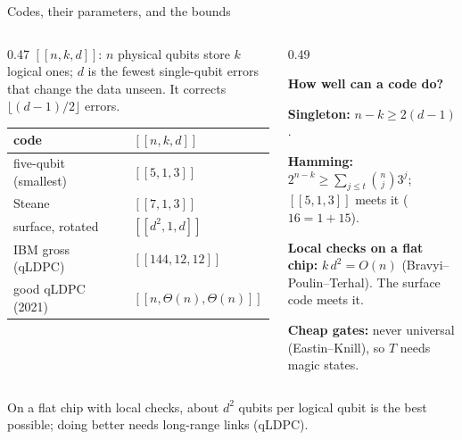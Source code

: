 \documentclass[aspectratio=169,11pt]{beamer}
\newcommand{\blocktitle}[1]{{\bfseries #1}\par\vskip1mm}
\begin{document}
{
\begin{frame}[noframenumbering]{Codes, their parameters, and the bounds}
  \begin{columns}[T,onlytextwidth]
    \begin{column}{0.47\textwidth}
      \small
      $[[n,k,d]]$: $n$ physical qubits store $k$ logical ones; $d$ is the fewest single-qubit errors that change the data unseen. It corrects $\lfloor(d-1)/2\rfloor$ errors.\par\vskip1mm
      \centering\footnotesize
      \renewcommand{\arraystretch}{1.12}
      \begin{tabular}{@{}ll@{}}
        \toprule
        code & $[[n,k,d]]$ \\
        \midrule
        five-qubit (smallest) & $[[5,1,3]]$ \\
        Steane & $[[7,1,3]]$ \\
        surface, rotated & $[[d^2,1,d]]$ \\
        IBM gross (qLDPC) & $[[144,12,12]]$ \\
        good qLDPC (2021) & $[[n,\Theta(n),\Theta(n)]]$ \\
        \bottomrule
      \end{tabular}
    \end{column}
    \begin{column}{0.49\textwidth}
      \begin{panel}
        \blocktitle{How well can a code do?}
        \small
        \textbf{Singleton:} $n-k\ge2(d-1)$.\par\vskip0.6mm
        \textbf{Hamming:} $2^{n-k}\ge\sum_{j\le t}\binom{n}{j}3^j$; $[[5,1,3]]$ meets it ($16=1+15$).\par\vskip0.6mm
        \textbf{Local checks on a flat chip:} $k\,d^2=O(n)$ (Bravyi--Poulin--Terhal). The surface code meets it.\par\vskip0.6mm
        \textbf{Cheap gates:} never universal (Eastin--Knill), so $T$ needs magic states.
      \end{panel}
    \end{column}
  \end{columns}
  \vskip1mm
  \begin{takeaway}On a flat chip with local checks, about $d^2$ qubits per logical qubit is the best possible; doing better needs long-range links (qLDPC).\end{takeaway}
\end{frame}}
\end{document}
